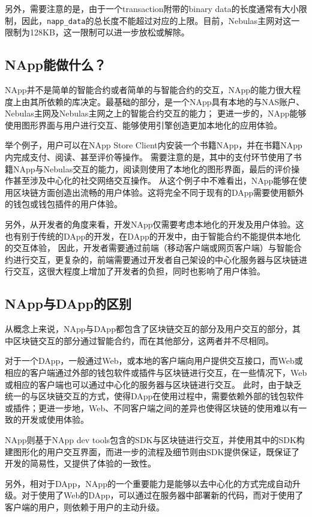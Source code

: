 另外，需要注意的是，由于一个transaction附带的binary data的长度通常有大小限制，因此，\texttt{napp\_data}的总长度不能超过对应的上限。目前，Nebulas主网对这一限制为128KB，这一限制可以进一步放松或解除。

\subsection{NApp能做什么？}
NApp并不是简单的智能合约或者简单的与智能合约的交互，NApp的能力很大程度上由其所依赖的库决定。最基础的部分，是一个NApp具有本地的与NAS账户、Nebulas主网及Nebulas主网之上的智能合约交互的能力；
更进一步的，NApp能够使用图形界面与用户进行交互、能够使用引擎创造更加本地化的应用体验。

举个例子，用户可以在NApp Store Client内安装一个书籍NApp，并在书籍NApp内完成支付、阅读、甚至评价等操作。
需要注意的是，其中的支付环节使用了书籍NApp与Nebulas交互的能力，阅读则使用了本地化的图形界面，最后的评价操作甚至涉及中心化的社交网络交互操作。
从这个例子中不难看出，NApp能够在使用区块链方面创造出流畅的用户体验。这将完全不同于现有的DApp需要使用额外的钱包或钱包插件的用户体验。

另外，从开发者的角度来看，开发NApp仅需要考虑本地化的开发及用户体验。这也有别于传统的DApp的开发，在DApp的开发中，由于智能合约不能提供本地化的交互体验，
因此，开发者需要通过前端（移动客户端或网页客户端）与智能合约进行交互，更复杂的，前端需要通过开发者自己架设的中心化服务器与区块链进行交互，这很大程度上增加了开发者的负担，同时也影响了用户体验。

\subsection{NApp与DApp的区别}
从概念上来说，NApp与DApp都包含了区块链交互的部分及用户交互的部分，其中区块链交互的部分通过智能合约，而在其他部分，这两者并不尽相同。

对于一个DApp，一般通过Web，或本地的客户端向用户提供交互接口，而Web或相应的客户端通过外部的钱包软件或插件与区块链进行交互，在一些情况下，Web或相应的客户端也可以通过中心化的服务器与区块链进行交互。
此时，由于缺乏统一的与区块链交互的方式，使得DApp在使用过程中，需要依赖外部的钱包软件或插件；更进一步地，Web、不同客户端之间的差异也使得区块链的使用难以有一致的开发或使用体验。

NApp则基于NApp dev tools包含的SDK与区块链进行交互，并使用其中的SDK构建图形化的用户交互界面，而进一步的流程及细节则由SDK提供保证，既保证了开发的简易性，又提供了体验的一致性。

另外，相对于DApp，NApp的一个重要能力是能够以去中心化的方式完成自动升级。对于使用了Web的DApp，可以通过在服务器中部署新的代码，而对于使用了客户端的用户，则依赖于用户的主动升级。

